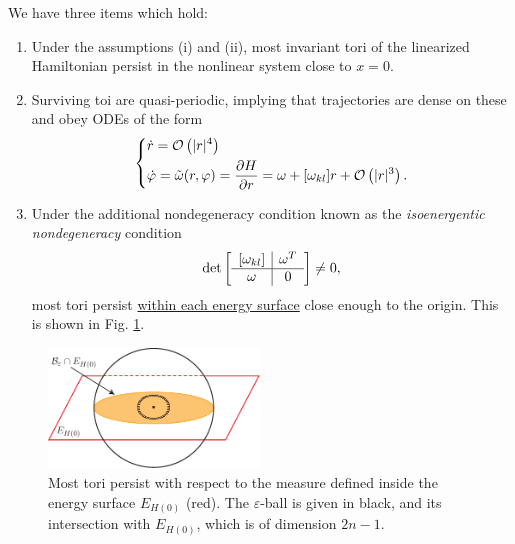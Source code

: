 \begin{theorem}
	We have three items which hold:
	\begin{enumerate}
		\item Under the assumptions (i) and (ii), most invariant tori of the linearized Hamiltonian persist in the nonlinear system close to $x=0$.
		\item Surviving toi are quasi-periodic, implying that trajectories are dense on these and obey ODEs of the form
			\begin{align}
				\begin{dcases}
				\dot{r} = \mathcal{O}\left( |r|^{4}\right) \\
				\dot{\varphi} = \tilde{\omega} (r, \varphi) = \frac{\partial H}{\partial r} = \omega + [\omega_{kl}]r + \mathcal{O}\left(|r|^{3}\right).
				\end{dcases}
			\end{align}
		\item Under the additional nondegeneracy condition known as the \emph{isoenergentic nondegeneracy} condition
			\begin{align}
				\det\left[
					\begin{array}{c | c}
						[\omega_{kl}] & \omega^{T} \\
						\hline
						\omega & 0
					\end{array}
				\right]
				\neq 0,
			\end{align}
			most tori persist \underline{within each energy surface} close enough to the origin. This is shown in Fig. \ref{fig:persisting_tori_energy}.	
	\end{enumerate}
\begin{figure}[h!]
	\centering
	\includegraphics[width=0.5\textwidth]{figures/ch8/21persisting_tori_energy.pdf}
	\caption{Most tori persist with respect to the measure defined inside the energy surface $E_{H(0)}$ (red). The $\varepsilon$-ball is given in black, and its intersection with $E_{H(0)}$, which is of dimension $2n-1$.}
	\label{fig:persisting_tori_energy}
\end{figure}
\end{theorem}

